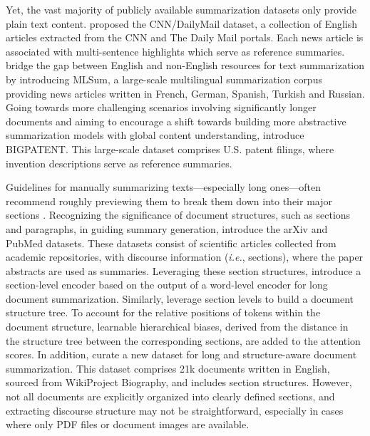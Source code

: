 Yet, the vast majority of publicly available summarization datasets only provide plain text content. \citet{hermann2015teaching} proposed the CNN/DailyMail dataset, a collection of English articles extracted from the CNN and The Daily Mail portals. Each news article is associated with multi-sentence highlights which serve as reference summaries. \citet{scialom2020mlsum} bridge the gap between English and non-English resources for text summarization by introducing MLSum, a large-scale multilingual summarization corpus providing news articles written in French, German, Spanish, Turkish and Russian. Going towards more challenging scenarios involving significantly longer documents and aiming to encourage a shift towards building more abstractive summarization models with global content understanding, \citet{sharma2019bigpatent} introduce BIGPATENT. This large-scale dataset comprises U.S. patent filings, where invention descriptions serve as reference summaries. 

Guidelines for manually summarizing texts—especially long ones—often recommend roughly previewing them to break them down into their major sections \citep{toprak2009three, luo2019reading}. Recognizing the significance of document structures, such as sections and paragraphs, in guiding summary generation, \citet{cohan2018discourse} introduce the arXiv and PubMed datasets. These datasets consist of scientific articles collected from academic repositories, with discourse information (\textit{i.e.}, sections), where the paper abstracts are used as summaries. Leveraging these section structures, \citet{cohan2018discourse} introduce a section-level encoder based on the output of a word-level encoder for long document summarization. Similarly, \citet{cao2022hibrids} leverage section levels to build a document structure tree. To account for the relative positions of tokens within the document structure, learnable hierarchical biases, derived from the distance in the structure tree between the corresponding sections, are added to the attention scores. In addition, \citet{cao2022hibrids} curate a new dataset for long and structure-aware document summarization. This dataset comprises 21k documents written in English, sourced from WikiProject Biography, and includes section structures. However, not all documents are explicitly organized into clearly defined sections, and extracting discourse structure may not be straightforward, especially in cases where only PDF files or document images are available.

